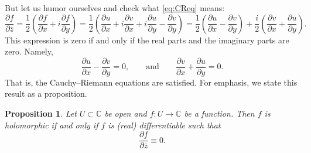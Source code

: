 \documentclass[12pt,openany]{book}
\newcommand{\C}{{\mathbb{C}}}
\theoremstyle{plain}
\newtheorem{prop}[thm]{Proposition}
\theoremstyle{remark}
\theoremstyle{definition}
\theoremstyle{exercise}
\theoremstyle{example}
\begin{document}
But let us humor ourselves and check what \eqref{eq:CReq} means:
\begin{equation*}
\frac{\partial f}{\partial \bar{z}} 
=
\frac{1}{2}
\left(
\frac{\partial f}{\partial x} + i
\frac{\partial f}{\partial y}
\right)
=
\frac{1}{2}
\left(
\frac{\partial u}{\partial x} 
+ i \frac{\partial v}{\partial x} 
+ i \frac{\partial u}{\partial y}
- \frac{\partial v}{\partial y}
\right) 
=
\frac{1}{2}
\left(
\frac{\partial u}{\partial x} 
- \frac{\partial v}{\partial y}
\right)
+
\frac{i}{2}
\left(
\frac{\partial v}{\partial x} 
+ \frac{\partial u}{\partial y}
\right) .
\end{equation*}
This expression is zero if and only if the real parts and the imaginary
parts are zero.  Namely,
\begin{equation*}
\frac{\partial u}{\partial x} 
- \frac{\partial v}{\partial y}
= 0,
\qquad
\text{and}
\qquad
\frac{\partial v}{\partial x} 
+ \frac{\partial u}{\partial y} = 0
.
\end{equation*}
That is, the Cauchy--Riemann equations are satisfied.  For emphasis,
we state this result as a proposition.

\begin{prop}
\label{prop:WirtCR}
Let $U \subset \C$ be open and $f \colon U \to \C$ be a function.
Then $f$ is holomorphic if and only if
$f$ is (real) differentiable such that
\begin{equation*}
\frac{\partial f}{\partial \bar{z}} \equiv 0 .
\end{equation*}
\end{prop}
\end{document}
